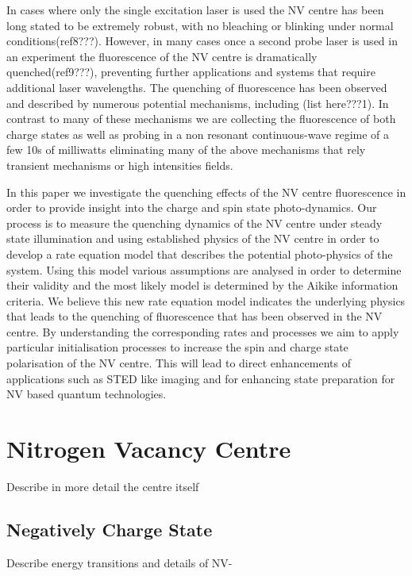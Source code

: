 \documentclass[preprint,prl,twocolumn]{revtex4}
\begin{document}
In cases where only the single excitation laser is used the NV centre has been long stated to be extremely robust, with no bleaching or blinking under normal conditions(ref8???). However, in many cases once a second probe laser is used in an experiment the fluorescence of the NV centre is dramatically quenched(ref9???), preventing further applications and systems that require additional laser wavelengths. The quenching of fluorescence has been observed and described by numerous potential mechanisms, including (list here???1). In contrast to many of these mechanisms we are collecting the fluorescence of both charge states as well as probing in a non resonant continuous-wave regime of a few 10s of milliwatts eliminating many of the above mechanisms that rely transient mechanisms or high intensities fields. 

In this paper we investigate the quenching effects of the NV centre fluorescence in order to provide insight into the charge and spin state photo-dynamics. Our process is to measure the quenching dynamics of the NV centre under steady state illumination and using established physics of the NV centre in order to develop a rate equation model that describes the potential photo-physics of the system. Using this model various assumptions are analysed in order to determine their validity and the most likely model is determined by the Aikike information criteria. We believe this new rate equation model indicates the underlying physics that leads to the quenching of fluorescence that has been observed in the NV centre. By understanding the corresponding rates and processes we aim to apply particular initialisation processes to increase the spin and charge state polarisation of the NV centre. This will lead to direct enhancements of applications such as STED like imaging and for enhancing state preparation for NV based quantum technologies.






\section{Nitrogen Vacancy Centre}
Describe in more detail the centre itself
\subsection{Negatively Charge State}
Describe energy transitions and details of NV-
\end{document}
